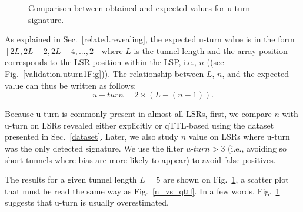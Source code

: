 \begin{figure}[!t]
  \begin{center}    
\hspace{-0.3cm}      
  \end{center}
  \caption{Comparison between obtained and expected values for u-turn
  signature.}
  \label{validation.uturn.fig}
\end{figure}

As explained in Sec.~\ref{related.revealing},  the expected u-turn value is in
the form $[2L, 2L-2, 2L-4,..., 2]$ where $L$ is the tunnel length and the array
position corresponds to the LSR position within the LSP, i.e., $n$ ((see Fig.~\ref{validation.uturn1Fig})).  The
relationship between $L$, $n$, and the expected value can thus be written as
follows:
\begin{equation}
u-turn = 2 \times (L - (n-1)) .
\label{eqn.uturn}
\end{equation}



Because u-turn is commonly present in almost all LSRs, first, we compare $n$
with u-turn on LSRs revealed either explicitly or qTTL-based using the dataset
presented in Sec.~\ref{dataset}. Later, we also study  $n$ value on LSRs where u-turn
was the only detected signature. We use the filter $\textit{u-turn}>3$ (i.e.,
avoiding so short tunnels where bias are more likely to appear) to avoid false
positives.

The results for a given tunnel length $L=5$ are shown on
Fig.~\ref{validation.uturn.fig}, a scatter plot that must be read the same way
as Fig.~\ref{n_vs_qttl}.  In a few words, Fig.~\ref{validation.uturn.fig}
suggests that u-turn is usually overestimated.  


